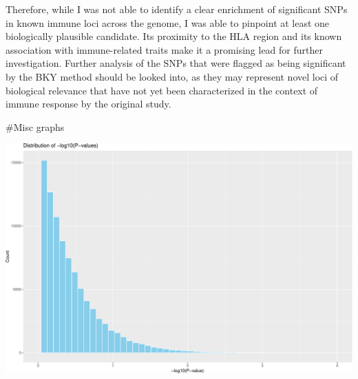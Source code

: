 \documentclass[
  12pt,
]{article}
\newenvironment{Shaded}{\begin{snugshade}}{\end{snugshade}}
\newcommand{\AttributeTok}[1]{\textcolor[rgb]{0.13,0.29,0.53}{#1}}
\newcommand{\DecValTok}[1]{\textcolor[rgb]{0.00,0.00,0.81}{#1}}
\newcommand{\FunctionTok}[1]{\textcolor[rgb]{0.13,0.29,0.53}{\textbf{#1}}}
\newcommand{\NormalTok}[1]{#1}
\newcommand{\OtherTok}[1]{\textcolor[rgb]{0.56,0.35,0.01}{#1}}
\newcommand{\SpecialCharTok}[1]{\textcolor[rgb]{0.81,0.36,0.00}{\textbf{#1}}}
\newcommand{\StringTok}[1]{\textcolor[rgb]{0.31,0.60,0.02}{#1}}
\begin{document}
Therefore, while I was not able to identify a clear enrichment of
significant SNPs in known immune loci across the genome, I was able to
pinpoint at least one biologically plausible candidate. Its proximity to
the HLA region and its known association with immune-related traits make
it a promising lead for further investigation. Further analysis of the
SNPs that were flagged as being significant by the BKY method should be
looked into, as they may represent novel loci of biological relevance
that have not yet been characterized in the context of immune response
by the original study.

\#Misc graphs

\begin{Shaded}
\end{Shaded}

\includegraphics{Arkesh_Das_CMSE_410_Semester_Project_files/figure-latex/normal distribution testing-1.pdf}
\end{document}
